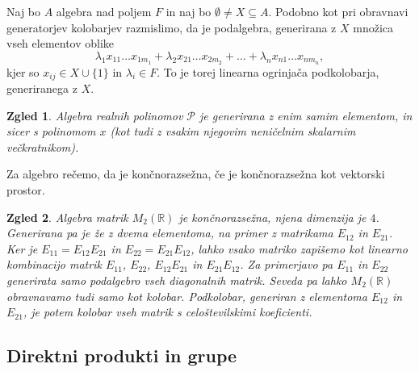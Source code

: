 \documentclass[10pt, a4paper]{article}
\newtheorem{zgled}{Zgled}[section]
\newcommand{\R}{\mathbb {R}}
\begin{document}
Naj bo $A$ algebra nad poljem $F$ in naj bo $\emptyset \neq X \subseteq A$.
Podobno kot pri obravnavi generatorjev kolobarjev razmislimo, da je podalgebra, generirana z $X$ množica vseh elementov oblike 
$$\lambda_1 x_{11} \dots x_{1{m_1}} + \lambda_2 x_{21} \dots x_{2{m_2}} + \dots + \lambda_n x_{n1} \dots x_{n{m_n}},$$
kjer so $x_{ij} \in X \cup \{1\}$ in $\lambda_i \in F$.
To je torej linearna ogrinjača podkolobarja, generiranega z $X$.

\begin{zgled}
  Algebra realnih polinomov $\mathcal{P}$ je generirana z enim samim elementom, in sicer s polinomom $x$ (kot tudi z vsakim njegovim neničelnim skalarnim večkratnikom).
\end{zgled}

Za algebro rečemo, da je končnorazsežna, če je končnorazsežna kot vektorski prostor.

\begin{zgled}
  Algebra matrik $M_2 (\R)$ je končnorazsežna, njena dimenzija je $4$.
  Generirana pa je že z dvema elementoma, na primer z matrikama $E_{12}$ in $E_{21}$.
  Ker je $E_{11} = E_{12} E_{21}$ in $E_{22} = E_{21} E_{12}$, lahko vsako matriko zapišemo kot linearno kombinacijo 
  matrik $E_{11}$, $E_{22}$, $E_{12} E_{21}$ in $E_{21} E_{12}$. Za primerjavo pa $E_{11}$ in $E_{22}$ generirata samo 
  podalgebro vseh diagonalnih matrik.
  Seveda pa lahko $M_2 (\R)$ obravnavamo tudi samo kot kolobar.
  Podkolobar, generiran z elementoma  $E_{12}$ in $E_{21}$, je potem kolobar vseh matrik s celoštevilskimi koeficienti.
\end{zgled}

\subsection{Direktni produkti in grupe}
\end{document}
